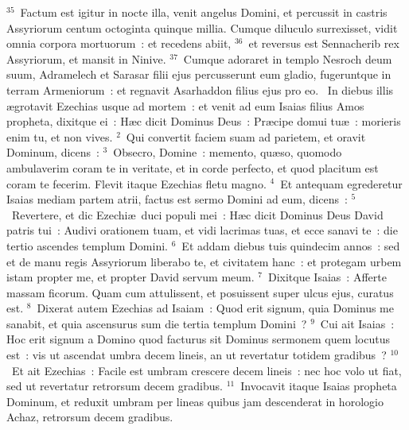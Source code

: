 ${}^{35}$~Factum est igitur in nocte illa, venit angelus Domini, et percussit in castris Assyriorum centum octoginta quinque millia. Cumque diluculo surrexisset, vidit omnia corpora mortuorum~: et recedens abiit,
${}^{36}$~et reversus est Sennacherib rex Assyriorum, et mansit in Ninive.
${}^{37}$~Cumque adoraret in templo Nesroch deum suum, Adramelech et Sarasar filii ejus percusserunt eum gladio, fugeruntque in terram Armeniorum~: et regnavit Asarhaddon filius ejus pro eo.
~\lettrine[lines=10,image=true,loversize=0.05,lraise=-0.03]{I}{}n diebus illis \ae grotavit Ezechias usque ad mortem~: et venit ad eum Isaias filius Amos propheta, dixitque ei~: H\ae c dicit Dominus Deus~: Pr\ae cipe domui tu\ae~: morieris enim tu, et non vives.
${}^{2}$~Qui convertit faciem suam ad parietem, et oravit Dominum, dicens~:
${}^{3}$~Obsecro, Domine~: memento, qu\ae so, quomodo ambulaverim coram te in veritate, et in corde perfecto, et quod placitum est coram te fecerim. Flevit itaque Ezechias fletu magno.
${}^{4}$~Et antequam egrederetur Isaias mediam partem atrii, factus est sermo Domini ad eum, dicens~:
${}^{5}$~Revertere, et dic Ezechi\ae\ duci populi mei~: H\ae c dicit Dominus Deus David patris tui~: Audivi orationem tuam, et vidi lacrimas tuas, et ecce sanavi te~: die tertio ascendes templum Domini.
${}^{6}$~Et addam diebus tuis quindecim annos~: sed et de manu regis Assyriorum liberabo te, et civitatem hanc~: et protegam urbem istam propter me, et propter David servum meum.
${}^{7}$~Dixitque Isaias~: Afferte massam ficorum. Quam cum attulissent, et posuissent super ulcus ejus, curatus est.
${}^{8}$~Dixerat autem Ezechias ad Isaiam~: Quod erit signum, quia Dominus me sanabit, et quia ascensurus sum die tertia templum Domini~?
${}^{9}$~Cui ait Isaias~: Hoc erit signum a Domino quod facturus sit Dominus sermonem quem locutus est~: vis ut ascendat umbra decem lineis, an ut revertatur totidem gradibus~?
${}^{10}$~Et ait Ezechias~: Facile est umbram crescere decem lineis~: nec hoc volo ut fiat, sed ut revertatur retrorsum decem gradibus.
${}^{11}$~Invocavit itaque Isaias propheta Dominum, et reduxit umbram per lineas quibus jam descenderat in horologio Achaz, retrorsum decem gradibus.


